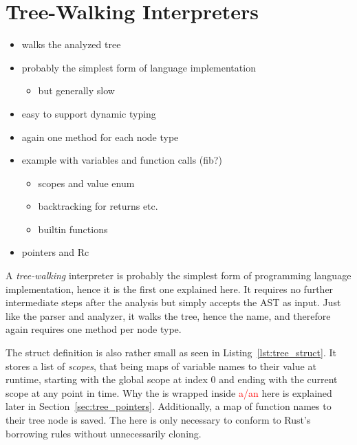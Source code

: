 \section{Tree-Walking Interpreters}

            \begin{itemize}
                \item walks the analyzed tree
                \item probably the simplest form of language implementation
                      \begin{itemize}
                          \item but generally slow
                      \end{itemize}
                \item easy to support dynamic typing
                \item again one method for each node type
                \item example with variables and function calls (fib?)
                      \begin{itemize}
                          \item scopes and value enum
                          \item backtracking for returns etc.
                          \item builtin functions
                      \end{itemize}
                \item pointers and Rc
            \end{itemize}

            A \emph{tree-walking} interpreter is probably the simplest form of programming language implementation, hence it is the first one explained here.
            It requires no further intermediate steps after the analysis but simply accepts the AST as input.
            Just like the parser and analyzer, it walks the tree, hence the name, and therefore again requires one method per node type.

            The struct definition is also rather small as seen in Listing~\ref{lst:tree_struct}.
            It stores a list of \emph{scopes}, that being maps of variable names to their value at runtime, starting with the global scope at index 0 and ending with the current scope at any point in time.
            Why the  is wrapped inside \textcolor{red}{a/an}  here is explained later in Section~\ref{sec:tree_pointers}.
            Additionally, a map of function names to their tree node is saved.
            The  here is only necessary to conform to Rust's borrowing rules without unnecessarily cloning.

